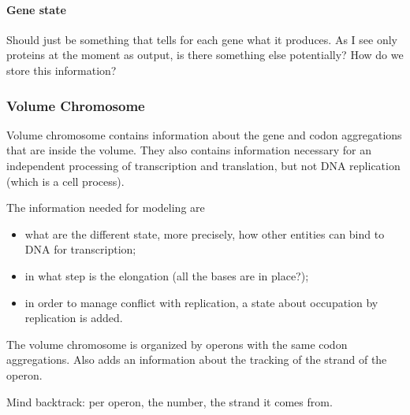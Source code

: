 \paragraph{Gene state}
\textcolor[rgb]{1.00,0.00,0.00}{Should just be something that tells for each gene what it produces. As I see only proteins at the moment as output, is there something else potentially? How do we store this information?}



\subsubsection{Volume Chromosome}
Volume chromosome contains information about the gene and codon aggregations that are inside the volume. They also contains information necessary for an independent processing of transcription and translation, but not DNA replication (which is a cell process).

\medskip

The information needed for modeling are
\begin{itemize}
  \item what are the different state, more precisely, how other entities can bind to DNA for transcription;
  \item in what step is the elongation (all the bases are in place?);
  \item in order to manage conflict with replication, a state about occupation by replication is added.
\end{itemize}
The volume chromosome is organized by operons with the same codon aggregations. Also adds an information about the tracking of the strand of the operon.

\textcolor[rgb]{1.00,0.00,0.00}{Mind backtrack: per operon, the number, the strand it comes from.}
